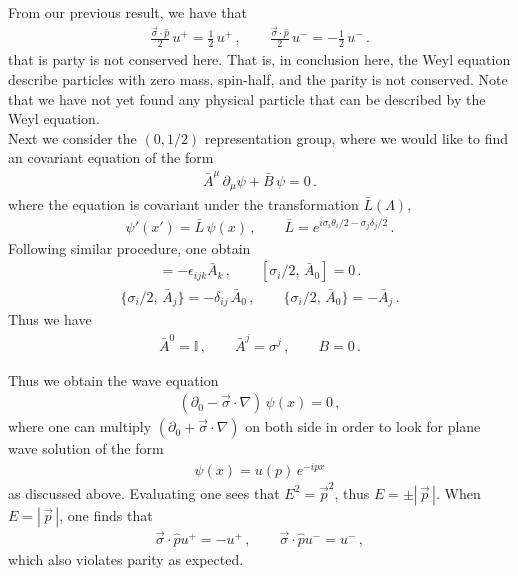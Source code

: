 \documentclass[11pt, onesided]{book}
\theoremstyle{break}
\theoremstyle{break}
\newcommand{\pd}{\partial}
\begin{document}
From our previous result, we have that
\begin{align*}
\frac{\vec{\sigma}\cdot \hat{p}}{2} \, u^+ = \frac{1}{2}\, u^+\,,\qquad
\frac{\vec{\sigma}\cdot \hat{p}}{2} \, u^- = -\frac{1}{2}\, u^-\,.
\end{align*}
that is party is not conserved here. That is, in conclusion here, the Weyl equation describe particles with zero mass, spin-half, and the parity is not conserved. Note that we have not yet found any physical particle that can be described by the Weyl equation. \\

Next we consider the $(0,1/2)$ representation group, where we would like to find an covariant equation of the form
\begin{align*}
\bar{A}^\mu \,\pd_\mu \psi + \bar{B}\,\psi = 0\,.
\end{align*}
where the equation is covariant under the transformation $\bar{L}(\Lambda)$,
\begin{align*}
\psi'(x') = \bar{L} \,\psi(x)\,,\qquad
\bar{L} = e^{i\sigma_i\theta_i/2 - \sigma_j \delta_j /2}\,.
\end{align*}
Following similar procedure, one obtain
\begin{align*}
[\sigma_i/2, \, \bar{A}_j] = -\epsilon_{ijk}\bar{A}_k\,,\qquad
[\sigma_i/2,\, \bar{A}_0] = 0\,.
\end{align*}
\begin{align*}
\{\sigma_i/2,\, \bar{A}_j\} = -\delta_{ij}\,\bar{A}_0\,,\qquad
\{ \sigma_i/2,\, \bar{A}_0\} = -\bar{A}_j\,.
\end{align*}
Thus we have
\begin{align*}
\bar{A}^0 = \mathbb{I}\,,\qquad \bar{A}^j = \sigma^j\,,\qquad B = 0\,.
\end{align*}


Thus we obtain the wave equation
\begin{align*}
\left(\pd_0 - \vec{\sigma}\cdot \nabla\right) \,\psi(x) =0\,,
\end{align*}
where one can multiply $(\pd_0  + \vec{\sigma}\cdot \nabla)$ on both side in order to look for plane wave solution of the form
\begin{align*}
\psi(x) = u(p) \, e^{-ipx}
\end{align*}
as discussed above. Evaluating one sees that $E^2 = \vec{p}^2$, thus $E = \pm |\,\vec{p}\,|$. When $E = |\,\vec{p}\,|$, one finds that
\begin{align*}
\vec{\sigma}\cdot \hat{p}u^+ = -u^+ \,,\qquad
\vec{\sigma}\cdot \hat{p}u^- = u^-\,,
\end{align*}
which also violates parity as expected.\\
\end{document}
